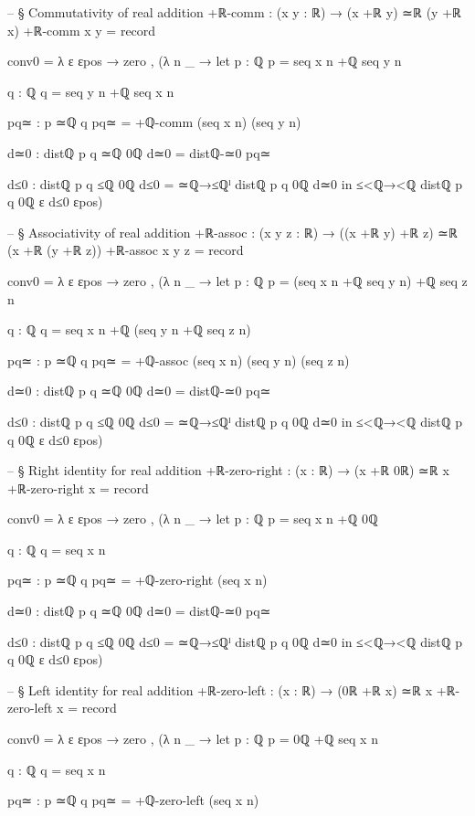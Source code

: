 \documentclass[11pt,a4paper]{book}
\begin{document}
\begin{code}
-- § Commutativity of real addition
+ℝ-comm : (x y : ℝ) → (x +ℝ y) ≃ℝ (y +ℝ x)
+ℝ-comm x y = record
  { conv0 = λ ε εpos →
      zero , (λ n _ →
        let
          p : ℚ
          p = seq x n +ℚ seq y n

          q : ℚ
          q = seq y n +ℚ seq x n

          pq≃ : p ≃ℚ q
          pq≃ = +ℚ-comm (seq x n) (seq y n)

          d≃0 : distℚ p q ≃ℚ 0ℚ
          d≃0 = distℚ-≃0 pq≃

          d≤0 : distℚ p q ≤ℚ 0ℚ
          d≤0 = ≃ℚ→≤ℚˡ {distℚ p q} {0ℚ} d≃0
        in
        ≤<ℚ→<ℚ {distℚ p q} {0ℚ} {ε} d≤0 εpos)
  }

-- § Associativity of real addition
+ℝ-assoc : (x y z : ℝ) → ((x +ℝ y) +ℝ z) ≃ℝ (x +ℝ (y +ℝ z))
+ℝ-assoc x y z = record
  { conv0 = λ ε εpos →
      zero , (λ n _ →
        let
          p : ℚ
          p = (seq x n +ℚ seq y n) +ℚ seq z n

          q : ℚ
          q = seq x n +ℚ (seq y n +ℚ seq z n)

          pq≃ : p ≃ℚ q
          pq≃ = +ℚ-assoc (seq x n) (seq y n) (seq z n)

          d≃0 : distℚ p q ≃ℚ 0ℚ
          d≃0 = distℚ-≃0 pq≃

          d≤0 : distℚ p q ≤ℚ 0ℚ
          d≤0 = ≃ℚ→≤ℚˡ {distℚ p q} {0ℚ} d≃0
        in
        ≤<ℚ→<ℚ {distℚ p q} {0ℚ} {ε} d≤0 εpos)
  }

-- § Right identity for real addition
+ℝ-zero-right : (x : ℝ) → (x +ℝ 0ℝ) ≃ℝ x
+ℝ-zero-right x = record
  { conv0 = λ ε εpos →
      zero , (λ n _ →
        let
          p : ℚ
          p = seq x n +ℚ 0ℚ

          q : ℚ
          q = seq x n

          pq≃ : p ≃ℚ q
          pq≃ = +ℚ-zero-right (seq x n)

          d≃0 : distℚ p q ≃ℚ 0ℚ
          d≃0 = distℚ-≃0 pq≃

          d≤0 : distℚ p q ≤ℚ 0ℚ
          d≤0 = ≃ℚ→≤ℚˡ {distℚ p q} {0ℚ} d≃0
        in
        ≤<ℚ→<ℚ {distℚ p q} {0ℚ} {ε} d≤0 εpos)
  }

-- § Left identity for real addition
+ℝ-zero-left : (x : ℝ) → (0ℝ +ℝ x) ≃ℝ x
+ℝ-zero-left x = record
  { conv0 = λ ε εpos →
      zero , (λ n _ →
        let
          p : ℚ
          p = 0ℚ +ℚ seq x n

          q : ℚ
          q = seq x n

          pq≃ : p ≃ℚ q
          pq≃ = +ℚ-zero-left (seq x n)

}
\end{code}
\end{document}

